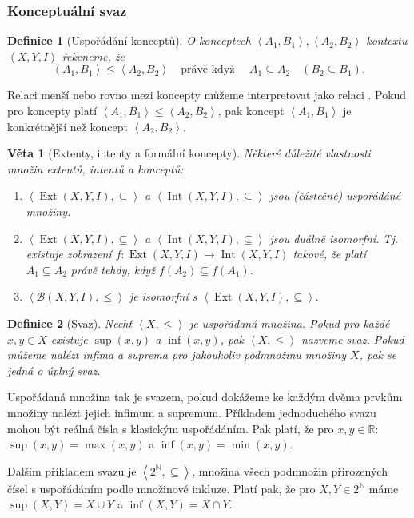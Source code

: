 \documentclass[12pt]{article}
\newcommand{\pravekdyz}{\mbox{právě když }}
\newcommand{\sssection}[1]{\subsubsection{#1}}
\newcommand{\addsp}[1]{\left<#1\right>}
\DeclareMathOperator{\ext}{Ext}
\DeclareMathOperator{\intfca}{Int}
\newcommand{\context}{\addsp{X, Y, I}}
\newcommand{\lattice}{\mathcal{B}(X, Y, I)}
\newtheorem{mydef}{Definice}
\newtheorem{theorem}{Věta}
\begin{document}
\sssection{Konceptuální svaz}
\begin{mydef}[Uspořádání konceptů]
\label{def.order}
O konceptech $\addsp{A_1, B_1}, \addsp{A_2, B_2}$ kontextu $\context$ řekeneme, že
$$\addsp{A_1, B_1}\le\addsp{A_2, B_2}\quad\pravekdyz\quad A_1\subseteq A_2 \quad(B_2\subseteq B_1).$$
\end{mydef}

Relaci menší nebo rovno mezi koncepty můžeme interpretovat jako relaci . Pokud pro koncepty platí $\addsp{A_1, B_1}\le\addsp{A_2, B_2}$, pak koncept $\addsp{A_1, B_1}$ je konkrétnější než koncept $\addsp{A_2, B_2}$. 

\begin{theorem}[Extenty, intenty a formální koncepty]Některé důležité vlastnosti množin extentů, intentů a konceptů:
\begin{enumerate}
	\item $\addsp{\ext(X,Y,I), \subseteq}$ a $\addsp{\intfca(X,Y,I), \subseteq}$ jsou (částečně) uspořádáné množiny. 
	\item $\addsp{\ext(X,Y,I), \subseteq}$ a $\addsp{\intfca(X,Y,I), \subseteq}$ jsou duálně isomorfní. Tj. existuje zobrazení $f: \ext(X,Y,I)\rightarrow\intfca(X,Y,I)$ takové, že platí $A_1\subseteq A_2$ právě tehdy, když $f(A_2)\subseteq f(A_1)$.
	\item $\addsp{\lattice, \le}$ je isomorfní s $\addsp{\ext(X,Y,I), \subseteq}.$
\end{enumerate}
\end{theorem}

\begin{mydef}[Svaz]
Nechť $\addsp{X, \le}$ je uspořádaná množina. Pokud pro každé $x,y\in X$ existuje $\sup(x,y)$ a $\inf(x,y)$, pak $\addsp{X, \le}$ nazveme svaz. Pokud můžeme nalézt infima a suprema pro jakoukoliv podmnožinu množiny $X$, pak se jedná o úplný svaz. 
\end{mydef}

Uspořádaná množina tak je svazem, pokud dokážeme ke každým dvěma prvkům množiny nalézt jejich infimum a supremum. Příkladem jednoduchého svazu mohou být reálná čísla s klasickým uspořádáním. Pak platí, že pro $x,y\in\mathbb{R}$: $\sup(x,y)=\max(x,y)$ a $\inf(x,y)=\min(x,y)$.

Dalším příkladem svazu je $\addsp{2^{\mathbb{N}}, \subseteq}$, množina všech podmnožin přirozených čísel s uspořádáním podle množinové inkluze. Platí pak, že pro $X, Y \in 2^{\mathbb{N}}$ máme $\sup(X, Y) = X \cup Y$ a $\inf(X, Y) = X \cap Y$.
\end{document}
